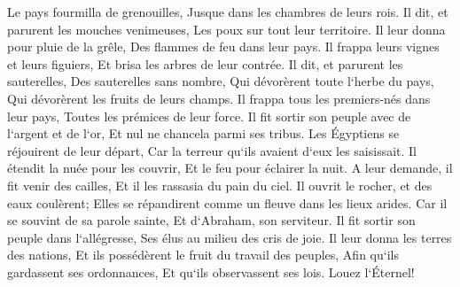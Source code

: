 \verse Le pays fourmilla de grenouilles, Jusque dans les chambres de leurs rois. 
\verse Il dit, et parurent les mouches venimeuses, Les poux sur tout leur territoire. 
\verse Il leur donna pour pluie de la grêle, Des flammes de feu dans leur pays. 
\verse Il frappa leurs vignes et leurs figuiers, Et brisa les arbres de leur contrée. 
\verse Il dit, et parurent les sauterelles, Des sauterelles sans nombre, 
\verse Qui dévorèrent toute l`herbe du pays, Qui dévorèrent les fruits de leurs champs. 
\verse Il frappa tous les premiers-nés dans leur pays, Toutes les prémices de leur force. 
\verse Il fit sortir son peuple avec de l`argent et de l`or, Et nul ne chancela parmi ses tribus. 
\verse Les Égyptiens se réjouirent de leur départ, Car la terreur qu`ils avaient d`eux les saisissait. 
\verse Il étendit la nuée pour les couvrir, Et le feu pour éclairer la nuit. 
\verse A leur demande, il fit venir des cailles, Et il les rassasia du pain du ciel. 
\verse Il ouvrit le rocher, et des eaux coulèrent; Elles se répandirent comme un fleuve dans les lieux arides. 
\verse Car il se souvint de sa parole sainte, Et d`Abraham, son serviteur. 
\verse Il fit sortir son peuple dans l`allégresse, Ses élus au milieu des cris de joie. 
\verse Il leur donna les terres des nations, Et ils possédèrent le fruit du travail des peuples, 
\verse Afin qu`ils gardassent ses ordonnances, Et qu`ils observassent ses lois. Louez l`Éternel! 

